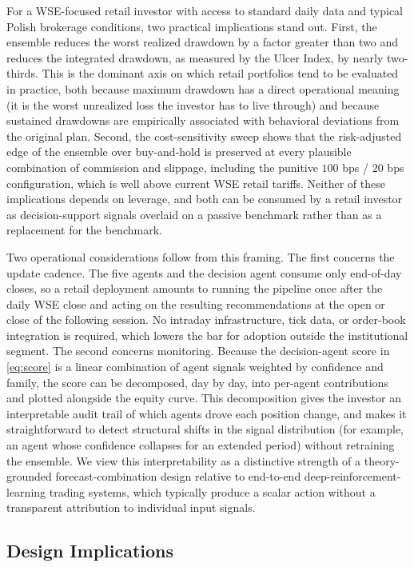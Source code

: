 \documentclass{ieeeaccess}
\begin{document}
For a WSE-focused retail investor with access to standard daily data and typical Polish brokerage conditions, two practical implications stand out. First, the ensemble reduces the worst realized drawdown by a factor greater than two and reduces the integrated drawdown, as measured by the Ulcer Index, by nearly two-thirds. This is the dominant axis on which retail portfolios tend to be evaluated in practice, both because maximum drawdown has a direct operational meaning (it is the worst unrealized loss the investor has to live through) and because sustained drawdowns are empirically associated with behavioral deviations from the original plan. Second, the cost-sensitivity sweep shows that the risk-adjusted edge of the ensemble over buy-and-hold is preserved at every plausible combination of commission and slippage, including the punitive $100$ bps / $20$ bps configuration, which is well above current WSE retail tariffs. Neither of these implications depends on leverage, and both can be consumed by a retail investor as decision-support signals overlaid on a passive benchmark rather than as a replacement for the benchmark.

Two operational considerations follow from this framing. The first concerns the update cadence. The five agents and the decision agent consume only end-of-day closes, so a retail deployment amounts to running the pipeline once after the daily WSE close and acting on the resulting recommendations at the open or close of the following session. No intraday infrastructure, tick data, or order-book integration is required, which lowers the bar for adoption outside the institutional segment. The second concerns monitoring. Because the decision-agent score in \eqref{eq:score} is a linear combination of agent signals weighted by confidence and family, the score can be decomposed, day by day, into per-agent contributions and plotted alongside the equity curve. This decomposition gives the investor an interpretable audit trail of which agents drove each position change, and makes it straightforward to detect structural shifts in the signal distribution (for example, an agent whose confidence collapses for an extended period) without retraining the ensemble. We view this interpretability as a distinctive strength of a theory-grounded forecast-combination design relative to end-to-end deep-reinforcement-learning trading systems, which typically produce a scalar action without a transparent attribution to individual input signals.

\subsection{Design Implications}
\end{document}
